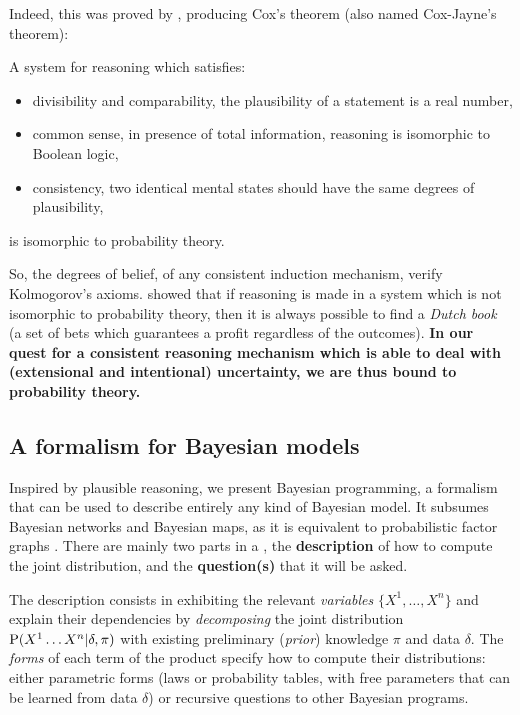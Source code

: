 Indeed, this was proved by \cite{Cox46}, producing Cox's theorem (also named Cox-Jayne's theorem):
\begin{mythm}
A system for reasoning which satisfies:
\begin{itemize}
    \item divisibility and comparability, the plausibility of a statement is a real number,
    \item common sense, in presence of total information, reasoning is isomorphic to Boolean logic,
    \item consistency, two identical mental states should have the same degrees of plausibility,
\end{itemize}
is isomorphic to probability theory.
\end{mythm}
So, the degrees of belief, of any consistent induction mechanism, verify Kolmogorov's axioms. \cite{DeFinetti37} showed that if reasoning is made in a system which is not isomorphic to probability theory, then it is always possible to find a \textit{Dutch book} (a set of bets which guarantees a profit regardless of the outcomes). \textbf{In our quest for a consistent reasoning mechanism which is able to deal with (extensional and intentional) uncertainty, we are thus bound to probability theory.} %


\subsection{A formalism for Bayesian models}
Inspired by plausible reasoning, we present Bayesian programming, a formalism that can be used to describe entirely any kind of Bayesian model. It subsumes Bayesian networks and Bayesian maps, as it is equivalent to probabilistic factor graphs \cite{Diard03}. There are mainly two parts in a , the \textbf{description} of how to compute the joint distribution, and the \textbf{question(s)} that it will be asked. 

The description consists in exhibiting the relevant \textit{variables} $\{X^1,\dots,X^n\}$ and explain their dependencies by \textit{decomposing} the joint distribution $\mathrm{P}(X^1\dots X^n | \delta, \pi)$ with existing preliminary (\textit{prior}) knowledge $\pi$ and data $\delta$. The \textit{forms} of each term of the product specify how to compute their distributions: either parametric forms (laws or probability tables, with free parameters that can be learned from data $\delta$) or recursive questions to other Bayesian programs.

